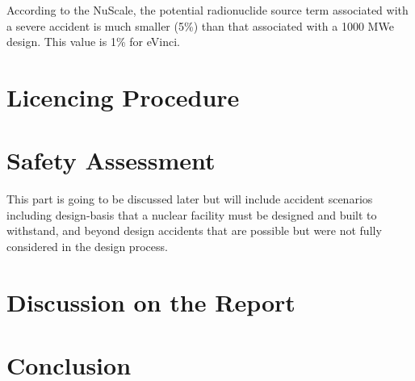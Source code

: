 \documentclass[10pt,a4paper]{article}
\begin{document}
According to the NuScale, the potential radionuclide source term associated with a severe accident is much smaller (5\%) than that associated with a 1000 MWe design. This value is 1\% for eVinci. 

\section{Licencing Procedure}


\section{Safety Assessment}
This part is going to be discussed later but will include accident scenarios including design-basis that a nuclear facility must be designed and built to withstand, and beyond design accidents that are possible but were not fully considered in the design process.

\section{Discussion on the Report}


\section{Conclusion}
\end{document}
